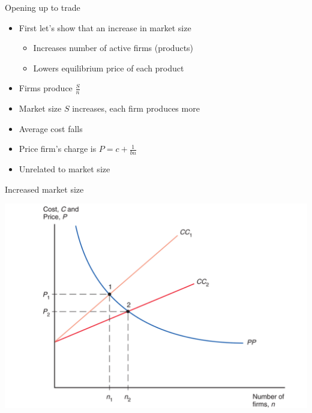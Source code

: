 \documentclass[ignorenonframetext,]{beamer}
\begin{document}
\begin{frame}{Opening up to trade}

    \begin{itemize}
        \item First let's show that an increase in market size
        \begin{itemize}
            \item Increases number of active firms (products)
            \item Lowers equilibrium price of each product
        \end{itemize}
    \item Firms produce $\frac{S}{n}$
    \item Market size $S$ increases, each firm produces more
    \item Average cost falls
    \item Price firm's charge is $P = c + \frac{1}{b n}$
    \item Unrelated to market size
    \end{itemize}

\end{frame}

\begin{frame}{Increased market size}
    
    \includegraphics[scale=0.25]{marketsize.png}

\end{frame}
\end{document}
